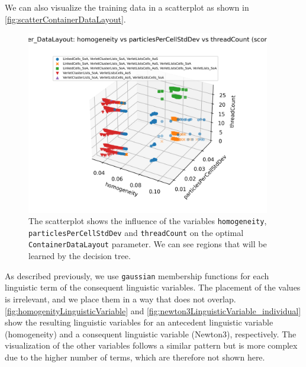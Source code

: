 We can also visualize the training data in a scatterplot as shown in \autoref{fig:scatterContainerDataLayout}.


\begin{figure}[H]
    \centering
    \includegraphics[height=8cm,trim={0cm 0.7cm 1cm 1.5cm},clip]{figures/DataAnalytics/scatter_container_datalayout.png}
    \caption[Scatterplot of the ContainerDataLayout parameter]{The scatterplot shows the influence of the variables \texttt{homogeneity}, \texttt{particlesPerCellStdDev} and \texttt{threadCount} on the optimal \texttt{ContainerDataLayout} parameter. We can see regions that will be learned by the decision tree.}
    \label{fig:scatterContainerDataLayout}

\end{figure}



As described previously, we use \texttt{gaussian} membership functions for each linguistic term of the consequent linguistic variables. The placement of the  values is irrelevant, and we place them in a way that does not overlap. \autoref{fig:homogenityLinguisticVariable} and \autoref{fig:newton3LinguisticVariable_individual} show the resulting linguistic variables for an antecedent linguistic variable (homogeneity) and a consequent linguistic variable (Newton3), respectively. The visualization of the other variables follows a similar pattern but is more complex due to the higher number of terms, which are therefore not shown here.



